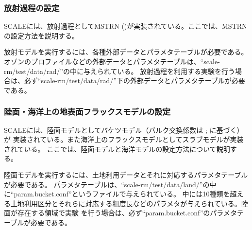 \subsubsection{放射過程の設定} \label{sec:adv_radiation}
SCALEには、放射過程としてMSTRN (\cite{sekiguchi_2008})が実装されている。ここでは、MSTRNの設定方法を説明する。

放射モデルを実行するには、各種外部データとパラメタテーブルが必要である。
オゾンのプロファイルなどの外部データとパラメタテーブルは、``scale-rm/test/data/rad/''の中に与えられている。
放射過程を利用する実験を行う場合は、必ず``scale-rm/test/data/rad/''下の外部データとパラメタテーブルが必要である。


\subsubsection{陸面・海洋上の地表面フラックスモデルの設定} \label{sec:adv_landocean}
SCALEには、陸面モデルとしてバケツモデル（バルク交換係数は \cite{beljaars_1991}; \cite{wilson_2001}に基づく）が
実装されている。また海洋上のフラックスモデルとしてスラブモデルが実装されている。
ここでは、陸面モデルと海洋モデルの設定方法について説明する。

陸面モデルを実行するには、土地利用データとそれに対応するパラメタテーブルが必要である。
パラメタテーブルは、``scale-rm/test/data/land/''の中に``param.bucket.conf''というファイルで与えられている。
中には10種類を超える土地利用区分とそれらに対応する粗度長などのパラメタが与えられている。陸面が存在する領域で実験
を行う場合は、必ず``param.bucket.conf''のパラメタテーブルが必要である。



